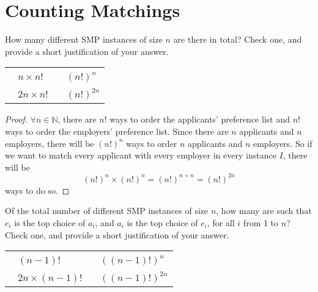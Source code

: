 \documentclass[11pt,fleqn]{exam}
\newcommand{\fillinMCmath}[1]{\begin{tikzpicture}\draw circle [radius=0.5em];\end{tikzpicture}\ #1}
\newcommand{\fillinMCmathsoln}[1]{\begin{tikzpicture}\draw[black, fill=blue] circle [radius=0.5em];\end{tikzpicture}\ #1}
\newif\ifsolutions\solutionsfalse
\newenvironment{soln}{\color{solnblue}}{}
\begin{document}
    \section{Counting Matchings}
     \begin{questions}
\question[2]
How many different SMP instances of size $n$ are there in total? Check one, and provide a short justification of your answer.

\vspace{.1in}

\ifsolutions

\else

\begin{tabular}{ll}
\hspace{1in} \fillinMCmath{} $n \times n!$ \hspace*{1.2in}&  \fillinMCmath{} $(n!)^{n}$ \\
\hspace{1in} \fillinMCmath{} $2n \times n!$ \hspace*{1.2in}&  \fillinMCmathsoln{} $(n!)^{2n}$
\end{tabular}

\begin{soln}
	\begin{proof}
		$\forall n \in \mathbb{N}$, there are $n!$ ways to order the applicants' preference list and $n!$ ways to order the employers' preference list.
		Since there are $n$ applicants and $n$ employers, there will be $(n!)^n$ ways to order $n$ applicants and $n$ employers.
		So if we want to match every applicant with every employer in every instance $I$, there will be 
		\[ {(n!)}^n \times {(n!)}^n = {(n!)}^{n + n} = {(n!)}^{2n} \]
		ways to do so.
	\end{proof}
\end{soln}

\fi

\vspace{.1in}

\question[2]
Of the total number of different SMP instances of size $n$, how many are such that $e_i$ is the top choice of $a_i$, and $a_i$ is the top choice of $e_i$, for all $i$ from 1 to $n$? Check one, and provide a short justification of your answer.

\vspace{.1in}

\ifsolutions

\else
\begin{tabular}{ll}
\hspace{1in} \fillinMCmath{} $(n-1)!$  \hspace*{.8in}&  \fillinMCmath{} $((n-1)!)^{n}$ \\
\hspace{1in} \fillinMCmath{} $2n \times (n-1)!$ \hspace*{.8in}&  \fillinMCmathsoln{} $((n-1)!)^{2n}$
\end{tabular}


\end{questions}
\end{document}
